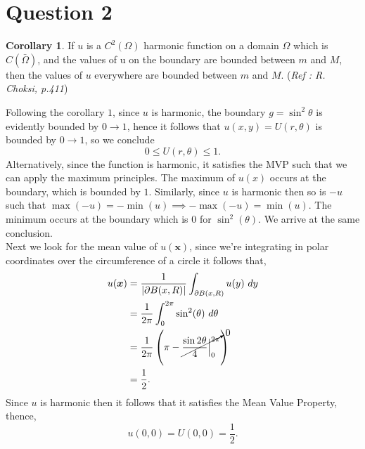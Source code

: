 \documentclass[
	12pt,
	]{article}
\theoremstyle{definition}
\newtheorem{corollary}{Corollary}
\theoremstyle{definition}
\theoremstyle{definition}
\theoremstyle{definition}
\theoremstyle{definition}
\theoremstyle{example}
\theoremstyle{note}
\theoremstyle{remark}
\theoremstyle{example}
\begin{document}
		\section*{Question 2}
			\begin{corollary}
				If $u$ is a $C^{2}(\Omega)$ harmonic function on a domain $\Omega$ which is $C(\bar{\Omega})$, and the values of u on the boundary are bounded between $m$ and $M$, then the values of $u$ everywhere are bounded between $m$ and $M$. (\textit{Ref : R. Choksi, p.411})
			\end{corollary}
		\noindent Following the corollary $1$, since $u$ is harmonic, the boundary $g = \sin^{2}\theta$ is evidently bounded by $0 \to 1$, hence it follows that $u(x,y) = U(r,\theta)$ is bounded by $0 \to 1$, so we conclude 
		$$ 0 \le U(r,\theta) \le 1.$$
		Alternatively, since the function is harmonic, it satisfies the MVP such that we can apply the maximum principles. The maximum of $u(x)$ occurs at the boundary, which is bounded by $1$. Similarly, since $u$ is harmonic then so is $-u$ such that $\max (-u) = -\min (u)\implies -\max (-u) = \min(u)$. The minimum occurs at the boundary which is $0$ for $\sin^{2}(\theta).$ We arrive at the same conclusion. \\
		
		\noindent Next we look for the mean value of $u(\boldsymbol{x})$, since we're integrating in polar coordinates over the circumference of a circle it follows that, 
		\begin{align*}
			u(\boldsymbol{x}) &= \frac{1}{\abs{\partial B(x,R)}} \int_{\partial B(x,R)} u(y) \ dy \\
			&=\frac{1}{2 \pi} \int_{0}^{2\pi} \sin^{2}(\theta) \ d\theta \\
			&= \frac{1}{2\pi} \left(\pi - \cancelto{0}{\frac{\sin 2\theta}{4} \Big|_{0}^{2\pi}}\right) \\
			&= \frac12.
		\end{align*}
		Since $u$ is harmonic then it follows that it satisfies the Mean Value Property, thence, $$u(0,0) = U(0,0) = \displaystyle \frac12.$$
\end{document}
